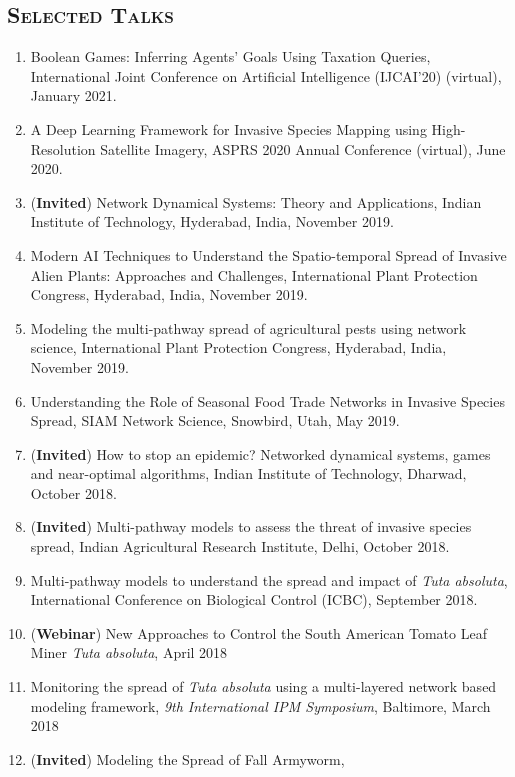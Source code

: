 \documentclass[margin,10pt]{res} %
\begin{document}
\begin{resume}
\section{\textnormal{\textsc{Selected Talks}}} 
\begin{enumerate}[1.]
    \item Boolean Games: Inferring Agents' Goals Using Taxation Queries,
    International Joint Conference on Artificial Intelligence (IJCAI'20)
    (virtual), January 2021.
    \item A Deep Learning Framework for Invasive Species Mapping using
    High-Resolution Satellite Imagery, ASPRS 2020 Annual Conference (virtual), June 2020.
    \item (\textbf{Invited}) Network Dynamical Systems: Theory and
    Applications, Indian Institute of Technology, Hyderabad, India,
    November 2019.
    \item Modern AI Techniques to Understand the Spatio-temporal Spread of
    Invasive Alien Plants: Approaches and Challenges, International Plant
    Protection Congress, Hyderabad, India, November 2019.
    \item Modeling the multi-pathway spread of agricultural pests using
    network science, International Plant Protection Congress, Hyderabad,
    India, November 2019.
    \item Understanding the Role of Seasonal Food Trade Networks in Invasive
Species Spread, SIAM Network Science, Snowbird, Utah,
    May 2019.
    \item (\textbf{Invited}) How to stop an epidemic? Networked dynamical
    systems, games and near-optimal algorithms, Indian Institute of
    Technology, Dharwad, October 2018.
    \item (\textbf{Invited}) Multi-pathway models to assess the threat of
    invasive species spread, Indian Agricultural Research Institute, Delhi,
    October 2018.
    \item Multi-pathway models to understand the spread and impact of
    \emph{Tuta
    absoluta}, International Conference on Biological Control (ICBC),
    September 2018.
    \item (\textbf{Webinar}) New Approaches to Control the South American Tomato
   Leaf Miner \emph{Tuta absoluta}, April 2018
   \item Monitoring the spread of {\it Tuta absoluta} using a
    multi-layered network based modeling framework, \emph{9th International
    IPM Symposium}, Baltimore, March 2018
    \item (\textbf{Invited}) Modeling the Spread of Fall Armyworm,

\end{enumerate}
\end{resume}
\end{document}
